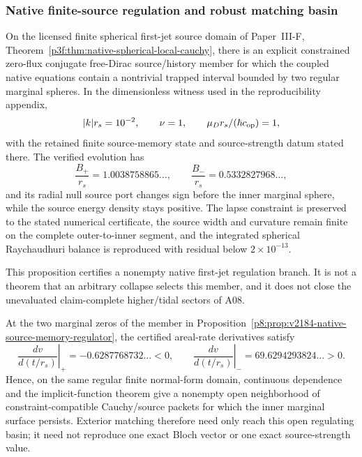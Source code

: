 \documentclass[12pt,a4paper]{article}
\begin{document}
\subsubsection{Native finite-source regulation and robust matching basin}

\begin{proposition}
\label{p8:prop:v2184-native-source-memory-regulator}
On the licensed finite spherical first-jet source domain of
Paper~III-F, Theorem~\ref{p3f:thm:native-spherical-local-cauchy}, there is an
explicit constrained zero-flux conjugate free-Dirac source/history member for
which the coupled native equations contain a nontrivial trapped interval
bounded by two regular marginal spheres.  In the dimensionless witness used in
the reproducibility appendix,
\[
 |k|r_s=10^{-2},\qquad \nu=1,\qquad
 \mu_Dr_s/(\hbar c_{\rm op})=1,
\]
with the retained finite source-memory state and source-strength datum stated
there.  The verified evolution has
\begin{equation}
\label{p8:eq:v2184-two-marginal-witness}
 \boxed{
 \frac{B_+}{r_s}=1.0038758865\ldots,\qquad
 \frac{B_-}{r_s}=0.5332827968\ldots,}
\end{equation}
and its radial null source port changes sign before the inner marginal sphere,
while the source energy density stays positive.  The lapse constraint is
preserved to the stated numerical certificate, the source width and curvature
remain finite on the complete outer-to-inner segment, and the integrated
spherical Raychaudhuri balance is reproduced with residual below
\(2\times10^{-13}\).

This proposition certifies a nonempty native first-jet regulation branch.  It
is not a theorem that an arbitrary collapse selects this member, and it does
not close the unevaluated claim-complete higher/tidal sectors of A08.
\end{proposition}

\begin{corollary}
\label{p8:cor:v2184-native-regulating-basin}
At the two marginal zeros of the member in
Proposition~\ref{p8:prop:v2184-native-source-memory-regulator}, the certified
areal-rate derivatives satisfy
\begin{equation}
\label{p8:eq:v2184-turn-transversality}
 \boxed{
 \left.\frac{d v}{d(t/r_s)}\right|_+=-0.6287768732\ldots<0,
 \qquad
 \left.\frac{d v}{d(t/r_s)}\right|_-=69.6294293824\ldots>0.}
\end{equation}
Hence, on the same regular finite normal-form domain, continuous dependence
and the implicit-function theorem give a nonempty open neighborhood of
constraint-compatible Cauchy/source packets for which the inner marginal
surface persists.  Exterior matching therefore need only reach this open
regulating basin; it need not reproduce one exact Bloch vector or one exact
source-strength value.
\end{corollary}
\end{document}
